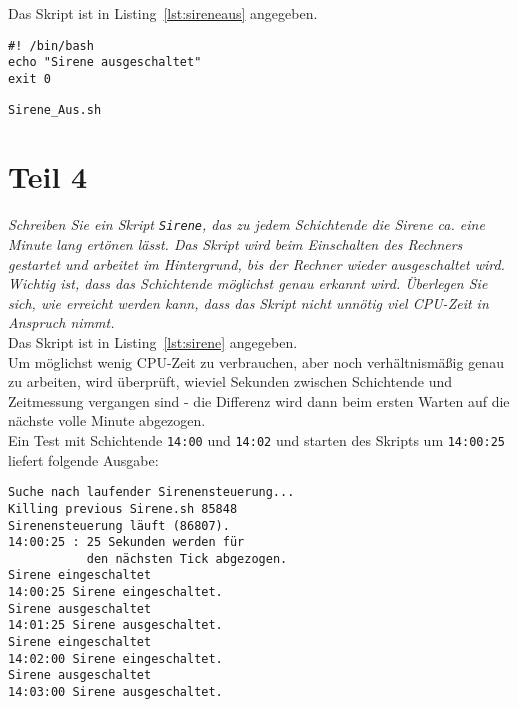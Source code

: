 \noindent
Das Skript ist in Listing~\ref{lst:sireneaus} angegeben.

\begin{listing}[H]
    \begin{verbatim}
#! /bin/bash
echo "Sirene ausgeschaltet"
exit 0
    \end{verbatim}
    \caption{\texttt{Sirene\_Aus.sh}}
    \label{lst:sireneaus}
\end{listing}


\section{Teil 4}

\textit{Schreiben Sie ein Skript \texttt{Sirene}, das zu jedem Schichtende die Sirene
ca. eine Minute lang ertönen lässt. Das Skript wird beim Einschalten
des Rechners gestartet und arbeitet im Hintergrund, bis der Rechner
wieder ausgeschaltet wird. Wichtig ist, dass das Schichtende möglichst
genau erkannt wird. Überlegen Sie sich, wie erreicht werden kann, dass
das Skript nicht unnötig viel CPU-Zeit in Anspruch nimmt.}\\

\noindent
Das Skript ist in Listing~\ref{lst:sirene} angegeben.\\

\noindent
Um möglichst wenig CPU-Zeit zu verbrauchen, aber noch verhältnismäßig genau zu arbeiten, wird überprüft, wieviel Sekunden zwischen Schichtende und Zeitmessung vergangen sind - die Differenz wird dann beim ersten Warten auf die nächste volle Minute abgezogen. \\

\noindent
Ein Test mit Schichtende \texttt{14:00} und \texttt{14:02} und starten des Skripts um \texttt{14:00:25} liefert folgende Ausgabe:

\begin{verbatim}
Suche nach laufender Sirenensteuerung...
Killing previous Sirene.sh 85848
Sirenensteuerung läuft (86807).
14:00:25 : 25 Sekunden werden für
           den nächsten Tick abgezogen.
Sirene eingeschaltet
14:00:25 Sirene eingeschaltet.
Sirene ausgeschaltet
14:01:25 Sirene ausgeschaltet.
Sirene eingeschaltet
14:02:00 Sirene eingeschaltet.
Sirene ausgeschaltet
14:03:00 Sirene ausgeschaltet.
\end{verbatim}

